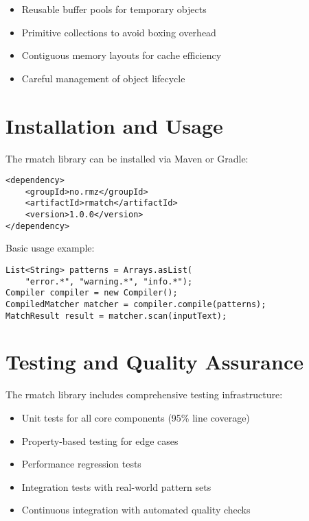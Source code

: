 \documentclass{article}
\begin{document}
\begin{itemize}
\item Reusable buffer pools for temporary objects
\item Primitive collections to avoid boxing overhead
\item Contiguous memory layouts for cache efficiency
\item Careful management of object lifecycle
\end{itemize}

\section{Installation and Usage}

The rmatch library can be installed via Maven or Gradle:

\begin{verbatim}
<dependency>
    <groupId>no.rmz</groupId>
    <artifactId>rmatch</artifactId>
    <version>1.0.0</version>
</dependency>
\end{verbatim}

Basic usage example:

\begin{verbatim}
List<String> patterns = Arrays.asList(
    "error.*", "warning.*", "info.*");
Compiler compiler = new Compiler();
CompiledMatcher matcher = compiler.compile(patterns);
MatchResult result = matcher.scan(inputText);
\end{verbatim}

\section{Testing and Quality Assurance}

The rmatch library includes comprehensive testing infrastructure:

\begin{itemize}
\item Unit tests for all core components (95\% line coverage)
\item Property-based testing for edge cases
\item Performance regression tests
\item Integration tests with real-world pattern sets
\item Continuous integration with automated quality checks 
\end{itemize}
\end{document}
